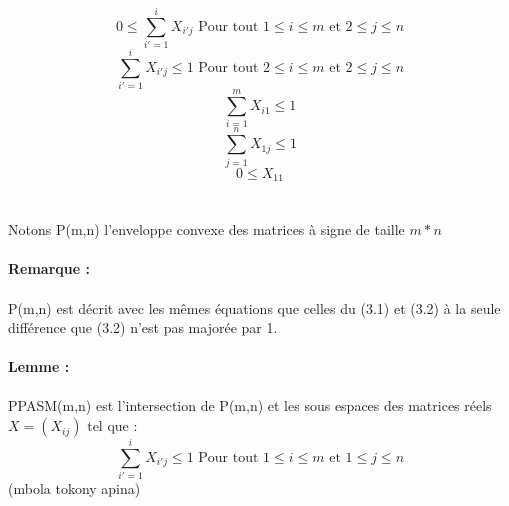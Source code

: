 \documentclass{book}
\begin{document}
\begin{equation}
0 \leqslant \sum_{i'=1}^{i} X_{i'j} \text{ Pour tout } 1 \leqslant i \leqslant m \text{ et } 2 \leqslant j \leqslant n
\end{equation}
\begin{equation}
\sum_{i'=1}^{i} X_{i'j}  \leqslant 1 \text{ Pour tout } 2 \leqslant i \leqslant m \text{ et } 2 \leqslant j \leqslant n
\end{equation}
\begin{equation}
\sum_{i=1}^{m} X_{i1}  \leqslant 1 
\end{equation}
\begin{equation}
\sum_{j=1}^{n} X_{1j}  \leqslant 1 
\end{equation}
\begin{equation}
0   \leqslant X_{11} 
\end{equation}
\\\\
Notons P(m,n) l'enveloppe convexe des matrices à signe de taille $m*n$ \\\\
\textbf{Remarque : }\\\\
P(m,n) est décrit avec les mêmes équations que celles du (3.1) et (3.2) à la seule différence que (3.2) n'est pas majorée par 1. \\\\
\textbf{Lemme : }\\\\
PPASM(m,n) est l'intersection de P(m,n) et les sous espaces des matrices réels $X=(X_{ij})$ tel que : \\
\begin{equation}
\sum_{i'=1}^{i} X_{i'j}  \leqslant 1 \text{ Pour tout } 1 \leqslant i \leqslant m \text{ et } 1 \leqslant j \leqslant n
\end{equation}
(mbola tokony apina)
\end{document}
